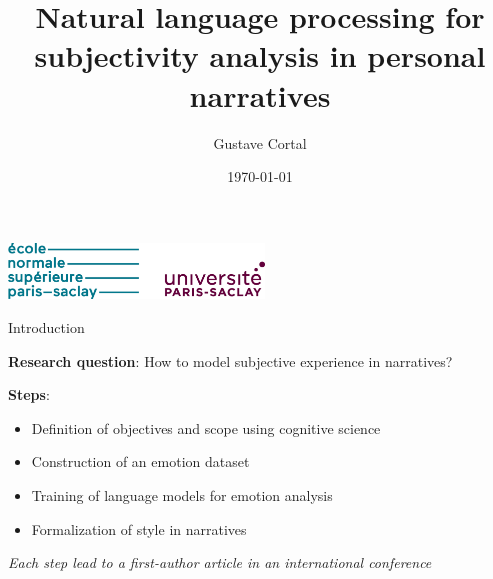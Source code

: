 \documentclass[handout,10pt]{beamer}
\title{Natural language processing for subjectivity analysis in personal narratives}
\author{Gustave Cortal}
\date{\today}
\begin{document}
\setlength{\parskip}{5pt}%
\setlength{\parsep}{0pt}%
\setlength{\itemsep}{0.25cm}%
\setlength{\leftmargini}{0.5cm}

\begin{frame}
  \titlepage
  \vspace{-1.5cm}
  \begin{center}
    \includegraphics[height=1.5cm]{img/logo_ens_saclay.png}
  \end{center}
\end{frame}


\begin{frame}{Introduction}




\pause

\textbf{Research question}: How to model subjective experience in narratives?


\vspace{0.5cm}
\pause

\textbf{Steps}:

\begin{itemize}[<+->]
    \item Definition of objectives and scope using cognitive science
    \item Construction of an emotion dataset 
    \item Training of language models for emotion analysis 
    \item Formalization of style in narratives 
\end{itemize}

\vspace{0.5cm}
\pause

\small

\textit{Each step lead to a first-author article in an international conference} %

    
\end{frame}
\end{document}
